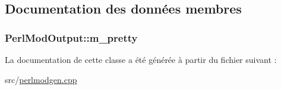 \subsection{Documentation des données membres}
\hypertarget{class_perl_mod_output_a814c200c15b3842ff2671f28a69db498}{}
\subsubsection[{m\+\_\+pretty}]{ Perl\+Mod\+Output\+::m\+\_\+pretty}\label{class_perl_mod_output_a814c200c15b3842ff2671f28a69db498}


La documentation de cette classe a été générée à partir du fichier suivant \+:\begin{DoxyCompactItemize}
\item 
src/\hyperlink{perlmodgen_8cpp}{perlmodgen.\+cpp}\end{DoxyCompactItemize}
